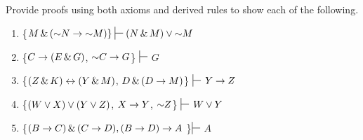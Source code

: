 {%

\noindent\problempart
Provide proofs using both axioms and derived rules to show each of the following.
\begin{enumerate}[label=(\arabic*)]
\item \{$M \eand (\enot N \eif \enot M) \} \sststile{}{} (N \eand M) \eor \enot M$




\item \{$C\rightarrow(E\,\&\, G)$, $\mathord{\sim} C \rightarrow G$\} $\sststile{}{}$ $G$
\item \{$(Z\,\&\, K)\leftrightarrow(Y\,\&\, M)$, $D\,\&\,(D\rightarrow M)$\} $\sststile{}{}$ $Y\rightarrow Z$




\item \{$(W \vee X) \vee (Y \vee Z)$, $X\rightarrow Y$, $\mathord{\sim} Z$\} $\sststile{}{}$ $W\vee Y$
\item \{$(B \rightarrow C) \,\&\, (C \rightarrow D), (B \rightarrow D) \rightarrow A $ \}$ \sststile{}{}$ $A$



\end{enumerate}

\noindent\problempart
\begin{enumerate}[label=(\arabic*)]


\end{enumerate}}
